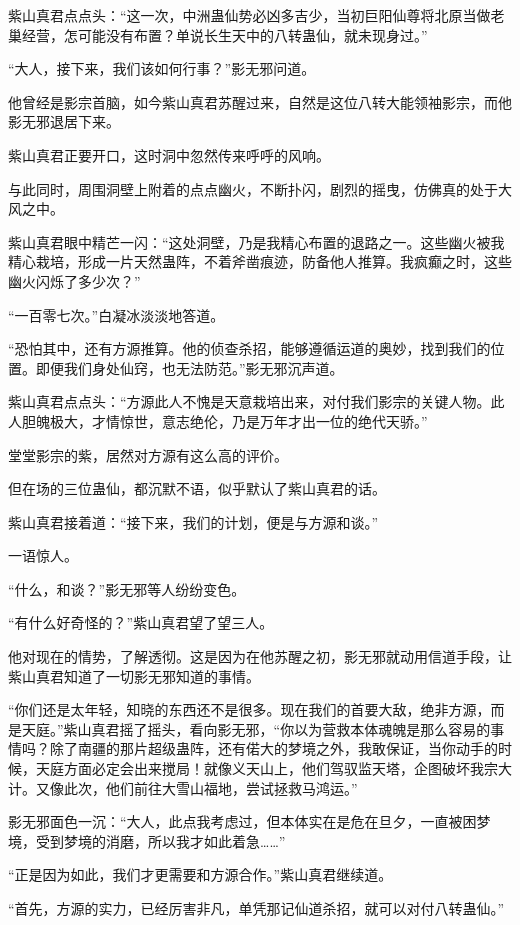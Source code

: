 \begin{this_body}
紫山真君点点头：“这一次，中洲蛊仙势必凶多吉少，当初巨阳仙尊将北原当做老巢经营，怎可能没有布置？单说长生天中的八转蛊仙，就未现身过。”

“大人，接下来，我们该如何行事？”影无邪问道。

他曾经是影宗首脑，如今紫山真君苏醒过来，自然是这位八转大能领袖影宗，而他影无邪退居下来。

紫山真君正要开口，这时洞中忽然传来呼呼的风响。

与此同时，周围洞壁上附着的点点幽火，不断扑闪，剧烈的摇曳，仿佛真的处于大风之中。

紫山真君眼中精芒一闪：“这处洞壁，乃是我精心布置的退路之一。这些幽火被我精心栽培，形成一片天然蛊阵，不着斧凿痕迹，防备他人推算。我疯癫之时，这些幽火闪烁了多少次？”

“一百零七次。”白凝冰淡淡地答道。

“恐怕其中，还有方源推算。他的侦查杀招，能够遵循运道的奥妙，找到我们的位置。即便我们身处仙窍，也无法防范。”影无邪沉声道。

紫山真君点点头：“方源此人不愧是天意栽培出来，对付我们影宗的关键人物。此人胆魄极大，才情惊世，意志绝伦，乃是万年才出一位的绝代天骄。”

堂堂影宗的紫，居然对方源有这么高的评价。

但在场的三位蛊仙，都沉默不语，似乎默认了紫山真君的话。

紫山真君接着道：“接下来，我们的计划，便是与方源和谈。”

一语惊人。

“什么，和谈？”影无邪等人纷纷变色。

“有什么好奇怪的？”紫山真君望了望三人。

他对现在的情势，了解透彻。这是因为在他苏醒之初，影无邪就动用信道手段，让紫山真君知道了一切影无邪知道的事情。

“你们还是太年轻，知晓的东西还不是很多。现在我们的首要大敌，绝非方源，而是天庭。”紫山真君摇了摇头，看向影无邪，“你以为营救本体魂魄是那么容易的事情吗？除了南疆的那片超级蛊阵，还有偌大的梦境之外，我敢保证，当你动手的时候，天庭方面必定会出来搅局！就像义天山上，他们驾驭监天塔，企图破坏我宗大计。又像此次，他们前往大雪山福地，尝试拯救马鸿运。”

影无邪面色一沉：“大人，此点我考虑过，但本体实在是危在旦夕，一直被困梦境，受到梦境的消磨，所以我才如此着急……”

“正是因为如此，我们才更需要和方源合作。”紫山真君继续道。

“首先，方源的实力，已经厉害非凡，单凭那记仙道杀招，就可以对付八转蛊仙。”


\end{this_body}
